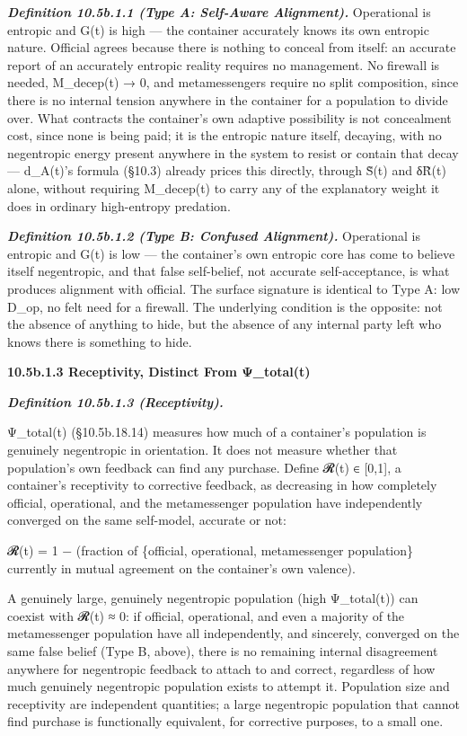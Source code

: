 \documentclass[
]{article}
\begin{document}
\emph{\textbf{Definition 10.5b.1.1 (Type A: Self-Aware Alignment).}}
Operational is entropic and G(t) is high --- the container accurately
knows its own entropic nature. Official agrees because there is nothing
to conceal from itself: an accurate report of an accurately entropic
reality requires no management. No firewall is needed, M\_decep(t) → 0,
and metamessengers require no split composition, since there is no
internal tension anywhere in the container for a population to divide
over. What contracts the container's own adaptive possibility is not
concealment cost, since none is being paid; it is the entropic nature
itself, decaying, with no negentropic energy present anywhere in the
system to resist or contain that decay --- d\_A(t)'s formula (§10.3)
already prices this directly, through S̃(t) and δR̃(t) alone, without
requiring M\_decep(t) to carry any of the explanatory weight it does in
ordinary high-entropy predation.

\emph{\textbf{Definition 10.5b.1.2 (Type B: Confused Alignment).}}
Operational is entropic and G(t) is low --- the container's own entropic
core has come to believe itself negentropic, and that false self-belief,
not accurate self-acceptance, is what produces alignment with official.
The surface signature is identical to Type A: low D\_op, no felt need
for a firewall. The underlying condition is the opposite: not the
absence of anything to hide, but the absence of any internal party left
who knows there is something to hide.

\textbf{10.5b.1.3 Receptivity, Distinct From Ψ\_total(t)}

\emph{\textbf{Definition 10.5b.1.3 (Receptivity).}}

Ψ\_total(t) (§10.5b.18.14) measures how much of a container's population
is genuinely negentropic in orientation. It does not measure whether
that population's own feedback can find any purchase. Define 𝓡(t) ∈
{[}0,1{]}, a container's receptivity to corrective feedback, as
decreasing in how completely official, operational, and the
metamessenger population have independently converged on the same
self-model, accurate or not:

𝓡(t) = 1 − (fraction of \{official, operational, metamessenger
population\} currently in mutual agreement on the container's own
valence).

A genuinely large, genuinely negentropic population (high Ψ\_total(t))
can coexist with 𝓡(t) ≈ 0: if official, operational, and even a majority
of the metamessenger population have all independently, and sincerely,
converged on the same false belief (Type B, above), there is no
remaining internal disagreement anywhere for negentropic feedback to
attach to and correct, regardless of how much genuinely negentropic
population exists to attempt it. Population size and receptivity are
independent quantities; a large negentropic population that cannot find
purchase is functionally equivalent, for corrective purposes, to a small
one.
\end{document}
